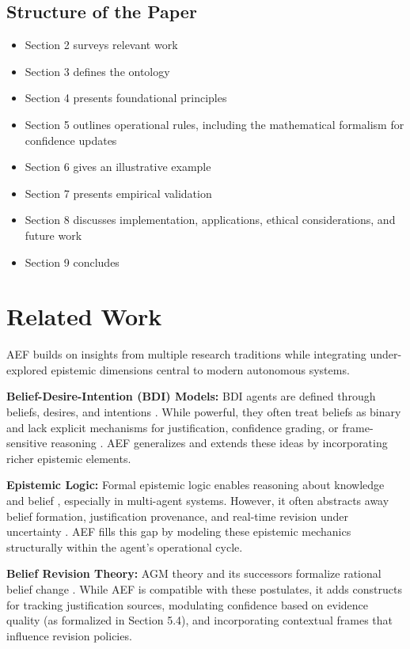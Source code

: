 \documentclass[10pt,a4paper]{article}
\begin{document}
\subsection{Structure of the Paper}
\begin{itemize}
\item Section 2 surveys relevant work
\item Section 3 defines the ontology
\item Section 4 presents foundational principles
\item Section 5 outlines operational rules, including the mathematical formalism for confidence updates
\item Section 6 gives an illustrative example
\item Section 7 presents empirical validation
\item Section 8 discusses implementation, applications, ethical considerations, and future work
\item Section 9 concludes
\end{itemize}

\section{Related Work}
AEF builds on insights from multiple research traditions while integrating under-explored epistemic dimensions central to modern autonomous systems.

\textbf{Belief-Desire-Intention (BDI) Models:} BDI agents are defined through beliefs, desires, and intentions \citep{bratman1987intention, rao1991modeling, bdi_extended1, bdi_extended2, wooldridge2009multiagent}. While powerful, they often treat beliefs as binary and lack explicit mechanisms for justification, confidence grading, or frame-sensitive reasoning \citep{bdi_limitations}. AEF generalizes and extends these ideas by incorporating richer epistemic elements.

\textbf{Epistemic Logic:} Formal epistemic logic enables reasoning about knowledge and belief \citep{fagin2003reasoning}, especially in multi-agent systems. However, it often abstracts away belief formation, justification provenance, and real-time revision under uncertainty \citep{epistemic_limitations}. AEF fills this gap by modeling these epistemic mechanics structurally within the agent's operational cycle.

\textbf{Belief Revision Theory:} AGM theory and its successors formalize rational belief change \citep{belief_revision1, belief_revision2, belief_revision3, belief_revision4}. While AEF is compatible with these postulates, it adds constructs for tracking justification sources, modulating confidence based on evidence quality (as formalized in Section 5.4), and incorporating contextual frames that influence revision policies.
\end{document}
